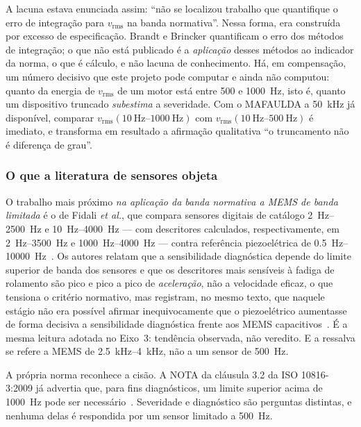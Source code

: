 \documentclass[11pt,a4paper]{article}
\begin{document}
A lacuna estava enunciada assim: ``não se localizou trabalho que quantifique o erro de
integração para $v_{\mathrm{rms}}$ na banda normativa''. Nessa forma, era construída por
excesso de especificação. Brandt e Brincker quantificam o erro dos métodos de integração;
o que não está publicado é a \emph{aplicação} desses métodos ao indicador da norma, o que
é cálculo, e não lacuna de conhecimento. Há, em compensação, um número decisivo que este
projeto pode computar e ainda não computou: quanto da energia de $v_{\mathrm{rms}}$ de um
motor está entre \num{500} e \SI{1000}{\hertz}, isto é, quanto um dispositivo truncado
\emph{subestima} a severidade. Com o MAFAULDA a \SI{50}{\kilo\hertz} já disponível,
comparar $v_{\mathrm{rms}}(\SIrange{10}{1000}{\hertz})$ com
$v_{\mathrm{rms}}(\SIrange{10}{500}{\hertz})$ é imediato, e transforma em resultado a
afirmação qualitativa ``o truncamento não é diferença de grau''.

\subsubsection{O que a literatura de sensores objeta}

O trabalho mais próximo \emph{na aplicação da banda normativa a MEMS de banda limitada} é
o de Fidali \emph{et al.}, que compara sensores digitais de catálogo
\SIrange{2}{2500}{\hertz} e \SIrange{10}{4000}{\hertz} --- com descritores calculados,
respectivamente, em \SIrange{2}{3500}{\hertz} e \SIrange{1000}{4000}{\hertz} --- contra
referência piezoelétrica de \SIrange{0,5}{10000}{\hertz}~\cite{fidali2024}. Os autores
relatam que a sensibilidade diagnóstica depende do limite superior de banda dos sensores e
que os descritores mais sensíveis à fadiga de rolamento são pico e pico a pico de
\emph{aceleração}, não a velocidade eficaz, o que tensiona o critério normativo, mas
registram, no mesmo texto, que naquele estágio não era possível afirmar inequivocamente
que o piezoelétrico aumentasse de forma decisiva a sensibilidade diagnóstica frente aos
MEMS capacitivos~\cite{fidali2024}. É a mesma leitura adotada no Eixo~3: tendência
observada, não veredito. E a ressalva se refere a MEMS de \SIrange{2,5}{4}{\kilo\hertz},
não a um sensor de \SI{500}{\hertz}.

A própria norma reconhece a cisão. A NOTA da cláusula 3.2 da ISO 10816-3:2009 já advertia
que, para fins diagnósticos, um limite superior acima de \SI{1000}{\hertz} pode ser
necessário~\cite{iso108163_2009}. Severidade e diagnóstico são perguntas distintas, e
nenhuma delas é respondida por um sensor limitado a \SI{500}{\hertz}.
\end{document}
